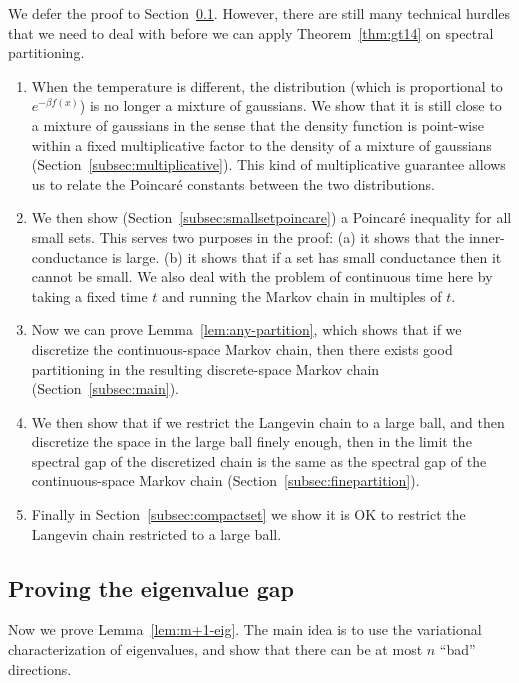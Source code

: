 We defer the proof to Section~\ref{subsec:gap}. 
However, there are still many technical hurdles that we need to deal with before we can apply Theorem~\ref{thm:gt14} on spectral partitioning.
\begin{enumerate}
\item When the temperature is different, the distribution (which is proportional to $e^{-\beta f(x)}$) is no longer a mixture of gaussians. We show that it is still close to a mixture of gaussians in the sense that the density function is point-wise within a fixed multiplicative factor to the density of a mixture of gaussians (Section~\ref{subsec:multiplicative}). This kind of multiplicative guarantee allows us to relate the Poincar\'e constants between the two distributions.
\item We then show (Section~\ref{subsec:smallsetpoincare}) a Poincar\'e inequality for all small sets. This serves two purposes in the proof: (a) it shows that the inner-conductance is large. (b) it shows that if a set has small conductance then it cannot be small. We also deal with the problem of continuous time here by taking a fixed time $t$ and running the Markov chain in multiples of $t$. 
\item Now we can prove Lemma~\ref{lem:any-partition}, which shows that if we discretize the continuous-space Markov chain, then there exists good partitioning in the resulting discrete-space Markov chain (Section~\ref{subsec:main}).
\item We then show that if we restrict the Langevin chain to a large ball, and then discretize the space in the large ball finely enough, then in the limit the spectral gap of the discretized chain is the same as the spectral gap of the continuous-space Markov chain (Section~\ref{subsec:finepartition}).
\item  Finally in Section~\ref{subsec:compactset} we show it is OK to restrict the Langevin chain restricted to a large ball.
\end{enumerate}

\subsection{Proving the eigenvalue gap}
\label{subsec:gap}
Now we prove Lemma~\ref{lem:m+1-eig}. The main idea is to use the variational characterization of eigenvalues, and show that there can be at most $n$ ``bad'' directions. 

